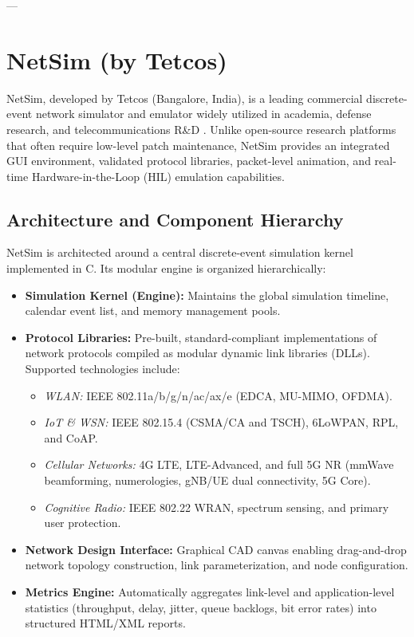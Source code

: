 ---

\section{NetSim (by Tetcos)}
\label{sec:netsim_platform}

NetSim, developed by Tetcos (Bangalore, India), is a leading commercial discrete-event network simulator and emulator widely utilized in academia, defense research, and telecommunications R\&D \cite{tetcos2020netsim}. Unlike open-source research platforms that often require low-level patch maintenance, NetSim provides an integrated GUI environment, validated protocol libraries, packet-level animation, and real-time Hardware-in-the-Loop (HIL) emulation capabilities.

\subsection{Architecture and Component Hierarchy}
NetSim is architected around a central discrete-event simulation kernel implemented in C. Its modular engine is organized hierarchically:
\begin{itemize}
    \item \textbf{Simulation Kernel (Engine):} Maintains the global simulation timeline, calendar event list, and memory management pools.
    \item \textbf{Protocol Libraries:} Pre-built, standard-compliant implementations of network protocols compiled as modular dynamic link libraries (DLLs). Supported technologies include:
    \begin{itemize}
        \item \textit{WLAN:} IEEE 802.11a/b/g/n/ac/ax/e (EDCA, MU-MIMO, OFDMA).
        \item \textit{IoT \& WSN:} IEEE 802.15.4 (CSMA/CA and TSCH), 6LoWPAN, RPL, and CoAP.
        \item \textit{Cellular Networks:} 4G LTE, LTE-Advanced, and full 5G NR (mmWave beamforming, numerologies, gNB/UE dual connectivity, 5G Core).
        \item \textit{Cognitive Radio:} IEEE 802.22 WRAN, spectrum sensing, and primary user protection.
    \end{itemize}
    \item \textbf{Network Design Interface:} Graphical CAD canvas enabling drag-and-drop network topology construction, link parameterization, and node configuration.
    \item \textbf{Metrics Engine:} Automatically aggregates link-level and application-level statistics (throughput, delay, jitter, queue backlogs, bit error rates) into structured HTML/XML reports.
\end{itemize}

